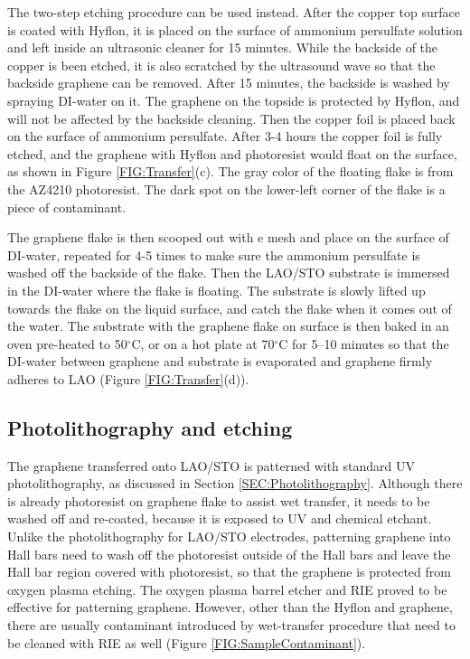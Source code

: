 \documentclass[pdflatex, sectionletters, 12pt]{pittetd}    %
\begin{document}
The two-step etching procedure can be used instead. After the copper top surface is coated with Hyflon, it is placed on the surface of ammonium persulfate solution and left inside an ultrasonic cleaner for 15 minutes. While the backside of the copper is been etched, it is also scratched by the ultrasound wave so that the backside graphene can be removed. After 15 minutes, the backside is washed by spraying DI-water on it. The graphene on the topside is protected by Hyflon, and will not be affected by the backside cleaning. Then the copper foil is placed back on the surface of ammonium persulfate. After 3-4 hours the copper foil is fully etched, and the graphene with Hyflon and photoresist would float on the surface, as shown in Figure \ref{FIG:Transfer}(c). The gray color of the floating flake is from the AZ4210 photoresist. The dark spot on the lower-left corner of the flake is a piece of contaminant. 

The graphene flake is then scooped out with e mesh and place on the surface of DI-water, repeated for 4-5 times to make sure the ammonium persulfate is washed off the backside of the flake. Then the LAO/STO substrate is immersed in the DI-water where the flake is floating. The substrate is slowly lifted up towards the flake on the liquid surface, and catch the flake when it comes out of the water. The substrate with the graphene flake on surface is then baked in an oven pre-heated to 50$^{\circ}$C, or on a hot plate at 70$^{\circ}$C for 5--10 minutes so that the DI-water between graphene and substrate is evaporated and graphene firmly adheres to LAO (Figure \ref{FIG:Transfer}(d)).

\subsection{Photolithography and etching}

The graphene transferred onto LAO/STO is patterned with standard UV photolithography, as discussed in Section \ref{SEC:Photolithography}. Although there is already photoresist on graphene flake to assist wet transfer, it needs to be washed off and re-coated, because it is exposed to UV and chemical etchant. Unlike the photolithography for LAO/STO electrodes, patterning graphene into Hall bars need to wash off the photoresist outside of the Hall bars and leave the Hall bar region covered with photoresist, so that the graphene is protected from oxygen plasma etching. The oxygen plasma barrel etcher and RIE proved to be effective for patterning graphene. However, other than the Hyflon and graphene, there are usually contaminant introduced by wet-transfer procedure that need to be cleaned with RIE as well (Figure \ref{FIG:SampleContaminant}). 
\end{document}
